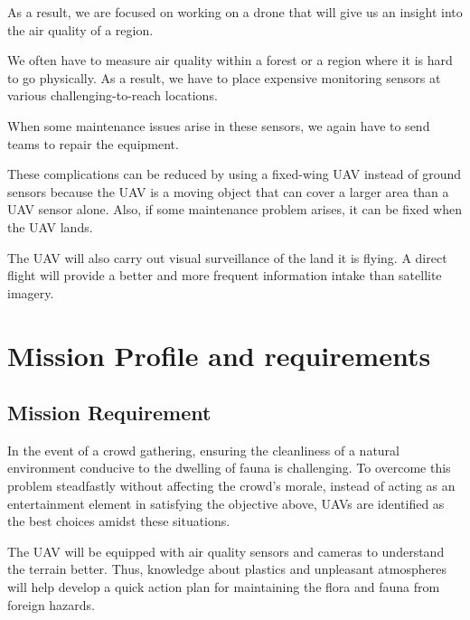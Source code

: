 \documentclass{article}
\begin{document}
As a result, we are focused on working on a drone that will give us an insight into the air quality of a region. 

We often have to measure air quality within a forest or a region where it is hard to go physically. As a result, we have to place expensive monitoring sensors at various challenging-to-reach locations. 

When some maintenance issues arise in these sensors, we again have to send teams to repair the equipment.

These complications can be reduced by using a fixed-wing UAV instead of ground sensors because the UAV is a moving object that can cover a larger area than a UAV sensor alone. Also, if some maintenance problem arises, it can be fixed when the UAV lands.

The UAV will also carry out visual surveillance of the land it is flying. A direct flight will provide a better and more frequent information intake than satellite imagery.

\section{Mission Profile and requirements}

\subsection{Mission Requirement}
In the event of a crowd gathering, ensuring the cleanliness of a natural environment conducive to the dwelling of fauna is challenging. To overcome this problem steadfastly without affecting the crowd's morale, instead of acting as an entertainment element in satisfying the objective above, UAVs are identified as the best choices amidst these situations. 


The UAV will be equipped with air quality sensors and cameras to understand the terrain better. Thus, knowledge about plastics and unpleasant atmospheres will help develop a quick action plan for maintaining the flora and fauna from foreign hazards.
\end{document}
